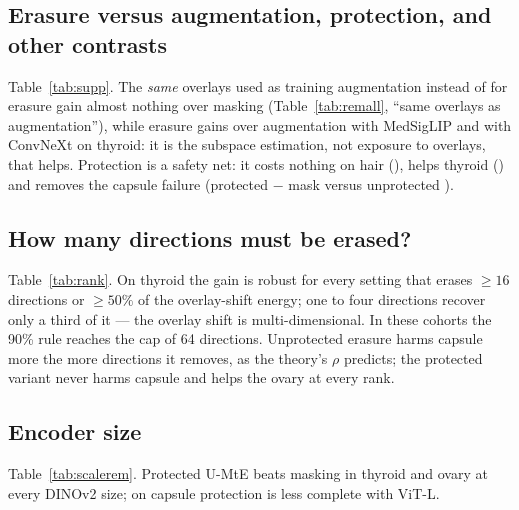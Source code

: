 \subsection{Erasure versus augmentation, protection, and other contrasts}
Table~\ref{tab:supp}. The \emph{same} overlays used as training augmentation instead of for erasure gain almost nothing
over masking (Table~\ref{tab:remall}, ``same overlays as augmentation''), while erasure gains \sSixScthyroidMedSigLIPmtemteaug{}
over augmentation with MedSigLIP and \sSixScthyroidConvNeXtmtemteaug{} with ConvNeXt on thyroid: it is the subspace
estimation, not exposure to overlays, that helps. Protection is a safety net: it costs nothing on hair
(\sSixSchairmteprotectmte), helps thyroid (\sSixScthyroidmteprotectmte) and removes the capsule failure (protected
$-$ mask \sSixSccapsulemteprotectmask{} versus unprotected \sSixSccapsulemtemask).


\subsection{How many directions must be erased?}
Table~\ref{tab:rank}. On thyroid the gain is robust for every setting that erases $\ge16$ directions or $\ge50\%$ of the
overlay-shift energy; one to four directions recover only a third of it --- the overlay shift is multi-dimensional. In these
cohorts the 90\% rule reaches the cap of 64 directions. Unprotected erasure harms capsule more the more directions it
removes, as the theory's $\rho$ predicts; the protected variant never harms capsule and helps the ovary at every rank.


\subsection{Encoder size}
Table~\ref{tab:scalerem}. Protected U-MtE beats masking in thyroid and ovary at every DINOv2 size; on capsule protection
is less complete with ViT-L.


